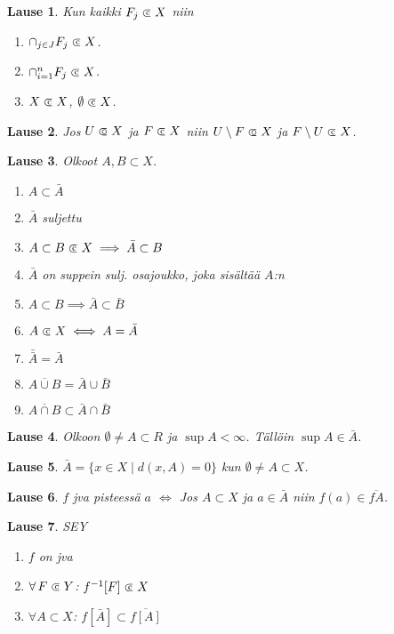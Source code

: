 \documentclass[landscape,a4paper,10pt]{article}
\newcommand\opn{\mathrel{\ooalign{$\subset$\cr
  \hidewidth\hbox{$\circ\mkern.5mu$}\cr}}}
\newcommand\cls{\mathrel{\ooalign{$\subset$\cr
\hidewidth\raise.225ex\hbox{$\text{{\scriptsize c}}\mkern2mu$}\cr}}}
\theoremstyle{customtheoremstyle}
\newtheorem*{theorem}{Lause}
\begin{document}
\begin{multicols*}{3}
\begin{theorem}
  Kun kaikki $F_j \cls X$ niin
  \begin{enumerate}
    \item{$\cap_{j \in J} F_j \cls X$.}
    \item{$\cap_{i=1}^{n} F_j \cls X$.}
    \item{$X \cls X$, $\emptyset \cls X$.}
  \end{enumerate}
\end{theorem}

\begin{theorem}
  Jos $U \opn X$ ja $F \cls X$ niin $U \setminus F \opn X$ ja $F \setminus U
  \cls X$.
\end{theorem}

\begin{theorem}
  Olkoot $A,B \subset X$.
  \begin{enumerate}
    \item[(1)]{$A \subset \bar{A}$}
    \item[(2)]{$\bar{A}$ suljettu}
    \item[(3)]{$A \subset B \cls X \implies \bar{A} \subset B$}
    \item[(4)]{$\bar{A}$ on suppein sulj. osajoukko, joka sisältää $A$:n}
    \item[(5)]{$A \subset B \implies \bar{A} \subset \bar{B}$}
    \item[(6)]{$A \cls X \iff A = \bar{A}$}
    \item[(7)]{$\bar{\bar{A}} = \bar{A}$}
    \item[(8)]{$\overline{A \cup B} = \bar{A} \cup \bar{B}$}
    \item[(9)]{$\overline{A \cap B} \subset \bar{A} \cap \bar{B}$}
  \end{enumerate}
\end{theorem}

\begin{theorem}
  Olkoon $\emptyset \neq A \subset R$ ja $\sup A < \infty$. Tällöin $\sup A \in
  \bar{A}$.
\end{theorem}

\begin{theorem}
  $\bar{A} = \{ x \in X \; | \; d(x,A) = 0 \}$ kun $\emptyset \neq A \subset X$.
\end{theorem}

\begin{theorem}
  $f$ jva pisteessä $a$ $\iff$ Jos $A \subset X$ ja $a \in \bar{A}$ niin
  $f(a) \in \overline{fA}$.
\end{theorem}

\begin{theorem}
  SEY
  \begin{enumerate}
    \item[(1)]{$f$ on jva}
    \item[(2)]{$\forall \, F \cls Y$: $f^{-1}[F] \cls X$ }
    \item[(3)]{$\forall A \subset X$: $f[\bar{A}] \subset \overline{f[A]}$}
  \end{enumerate}
\end{theorem}
\end{multicols*}
\end{document}

